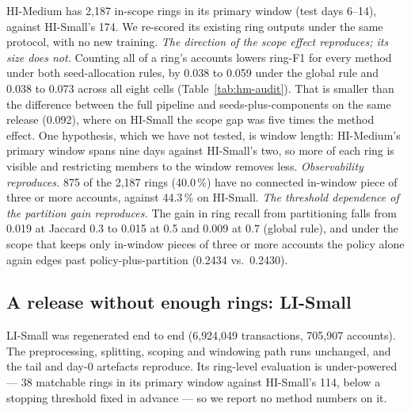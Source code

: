 HI-Medium has 2{,}187 in-scope rings in its primary window (test days 6--14), against
HI-Small's 174. We re-scored its existing ring outputs under the same protocol, with no new
training.
\emph{The direction of the scope effect reproduces; its size does not.} Counting all of a
ring's accounts lowers ring-F1 for every method under both seed-allocation rules, by 0.038 to
0.059 under the global rule and 0.038 to 0.073 across all eight cells
(Table~\ref{tab:hm-audit}). That is smaller than the difference between the full pipeline and
seeds-plus-components on the same release (0.092), where on HI-Small the scope gap was five
times the method effect. One hypothesis, which we have not tested, is window length: HI-Medium's
primary window spans nine days against HI-Small's two, so more of each ring is visible and
restricting members to the window removes less.
\emph{Observability reproduces.} 875 of the 2{,}187 rings (40.0\,\%) have no connected in-window
piece of three or more accounts, against 44.3\,\% on HI-Small.
\emph{The threshold dependence of the partition gain reproduces.} The gain in ring recall from
partitioning falls from 0.019 at Jaccard 0.3 to 0.015 at 0.5 and 0.009 at 0.7 (global rule),
and under the scope that keeps only in-window pieces of three or more accounts the policy alone
again edges past policy-plus-partition (0.2434 vs.\ 0.2430).



\subsection{A release without enough rings: LI-Small}

LI-Small was regenerated end to end (6{,}924{,}049 transactions, 705{,}907 accounts). The
preprocessing, splitting, scoping and windowing path runs unchanged, and the tail and day-0
artefacts reproduce. Its ring-level evaluation is under-powered --- 38 matchable rings in its
primary window against HI-Small's 114, below a stopping threshold fixed in advance --- so we
report no method numbers on it.
